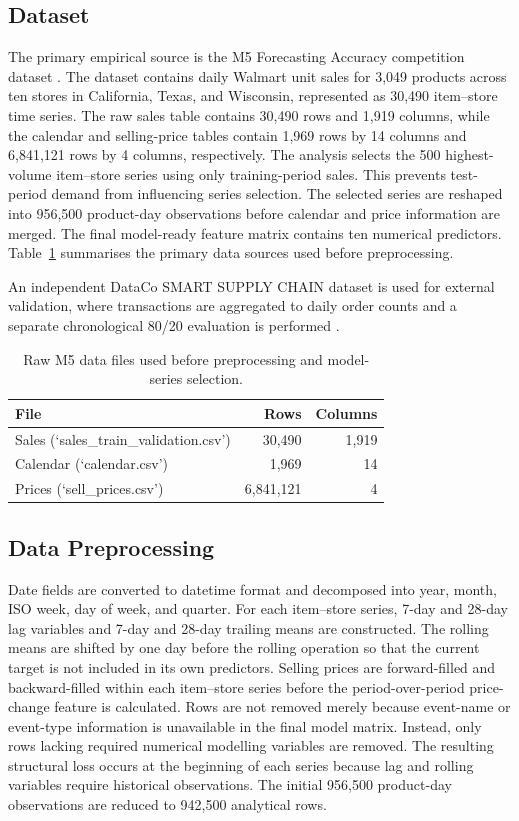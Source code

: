 \subsection{Dataset}

The primary empirical source is the M5 Forecasting Accuracy competition dataset \cite{Makridakis2022M5}.
The dataset contains daily Walmart unit sales for 3,049 products across ten stores in California, Texas, and Wisconsin, represented as 30,490 item--store time series.
The raw sales table contains 30,490 rows and 1,919 columns, while the calendar and selling-price tables contain 1,969 rows by 14 columns and 6,841,121 rows by 4 columns, respectively.
The analysis selects the 500 highest-volume item--store series using only training-period sales.
This prevents test-period demand from influencing series selection.
The selected series are reshaped into 956,500 product-day observations before calendar and price information are merged.
The final model-ready feature matrix contains ten numerical predictors. Table~\ref{tab:rawdata} summarises the primary data sources used before preprocessing.

An independent DataCo SMART SUPPLY CHAIN dataset is used for external validation, where transactions are aggregated to daily order counts and a separate chronological 80/20 evaluation is performed \cite{DataCo2019}.

\begin{table}[!t]
\centering
\caption{Raw M5 data files used before preprocessing and model-series selection.}
\label{tab:rawdata}
\begin{tabular}{lrr}
\toprule
\textbf{File} & \textbf{Rows} & \textbf{Columns} \\
\midrule
Sales (`sales\_train\_validation.csv') & 30,490 & 1,919 \\
Calendar (`calendar.csv') & 1,969 & 14 \\
Prices (`sell\_prices.csv') & 6,841,121 & 4 \\
\bottomrule
\end{tabular}
\end{table}

\subsection{Data Preprocessing}

Date fields are converted to datetime format and decomposed into year, month, ISO week, day of week, and quarter.
For each item--store series, 7-day and 28-day lag variables and 7-day and 28-day trailing means are constructed.
The rolling means are shifted by one day before the rolling operation so that the current target is not included in its own predictors.
Selling prices are forward-filled and backward-filled within each item--store series before the period-over-period price-change feature is calculated.
Rows are not removed merely because event-name or event-type information is unavailable in the final model matrix.
Instead, only rows lacking required numerical modelling variables are removed.
The resulting structural loss occurs at the beginning of each series because lag and rolling variables require historical observations.
The initial 956,500 product-day observations are reduced to 942,500 analytical rows.

